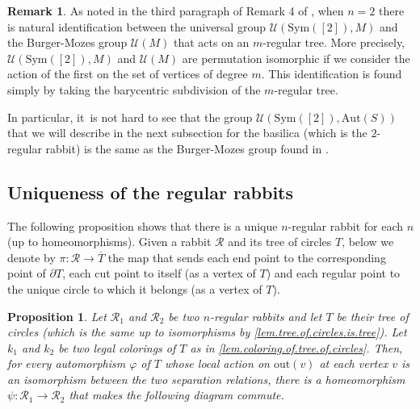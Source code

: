 \documentclass[10pt,a4paper]{amsart}
\newtheorem{proposition}[proposition]{Proposition}
\theoremstyle{definition}
\newtheorem{remark}[remark]{Remark}
\let\ts\textstyle
\newcommand{\Aut}{\mathrm{Aut}}
\newcommand{\Sym}{\mathrm{Sym}}
\newcommand{\R}{\mathcal{R}}
\newcommand{\U}{\mathcal{U}}
\begin{document}
\begin{remark}
\label{rmk.BM.and.biregular}
As noted in the third paragraph of Remark 4 of \cite{biregular}, when $n=2$ there is natural identification between the universal group $\U(\Sym([2]),M)$ and the Burger-Mozes group $\U(M)$ that acts on an $m$-regular tree.
More precisely, $\U(\Sym([2]),M)$ and $\U(M)$ are permutation isomorphic if we consider the action of the first on the set of vertices of degree $m$.
This identification is found simply by taking the barycentric subdivision of the $m$-regular tree.

In particular, it~is not hard to see that the group $\U(\Sym([2]),\Aut(S))$ that we will describe in the next subsection for the basilica (which is the $2$-regular rabbit) is the same as the Burger-Mozes group found in \cite{Neretin}.
\end{remark}

\subsection{Uniqueness of the regular rabbits}


The following proposition shows that there is a unique $n$-regular rabbit for each $n$ (up to homeomorphisms).
Given a rabbit $\R$ and its tree of circles $T$, below we denote by $\pi \colon \R \to \overline{T}$ the map that sends each end point to the corresponding point of $\partial T$, each cut point to itself (as a vertex of $T$) and each regular point to the unique circle to which it belongs (as a vertex of $T$).

\begin{proposition}
\label{prop.rabbit.surjectivity}
Let $\R_1$ and $\R_2$ be two $n$-regular rabbits and let $T$ be their tree of circles (which is the same up to isomorphisms by \cref{lem.tree.of.circles.is.tree}).
Let $k_1$ and $k_2$ be two legal colorings of $T$ as in \cref{lem.coloring.of.tree.of.circles}.
Then, for every automorphism $\varphi$ of $T$ whose local action on $\mathrm{out}(v)$ at each vertex $v$ is an isomorphism between the two separation relations, there is a homeomorphism $\psi \colon \R_1 \to \R_2$ that makes the following diagram commute.\vspace*{-3pt}
\begin{center}
\end{center}
\end{proposition}
\end{document}
